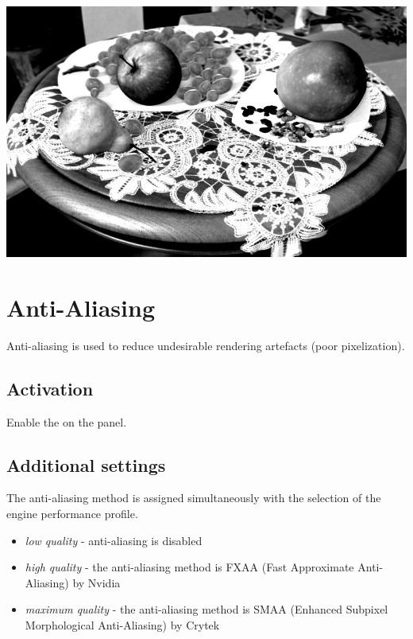 \documentclass[a4paper,12pt,oneside]{sphinxmanual}
\begin{document}
{\hfill\includegraphics[width=1.000\linewidth]{color_correction.jpg}\hfill}

\begin{DUlineblock}{0em}
\item[] 
\end{DUlineblock}


\section{Anti-Aliasing}
\label{postprocessing_effects:antialiasing}\label{postprocessing_effects:index-7}\label{postprocessing_effects:id26}
Anti-aliasing is used to reduce undesirable rendering artefacts (poor pixelization).


\subsection{Activation}
\label{postprocessing_effects:id27}
Enable the  on the  panel.


\subsection{Additional settings}
\label{postprocessing_effects:id28}
The anti-aliasing method is assigned simultaneously with the selection of the engine performance profile.
\begin{itemize}
\item {} 
\emph{low quality} - anti-aliasing is disabled

\item {} 
\emph{high quality} - the anti-aliasing method is FXAA (Fast Approximate Anti-Aliasing) by Nvidia

\item {} 
\emph{maximum quality} - the anti-aliasing method is SMAA (Enhanced Subpixel Morphological Anti-Aliasing) by Crytek

\end{itemize}
\end{document}
